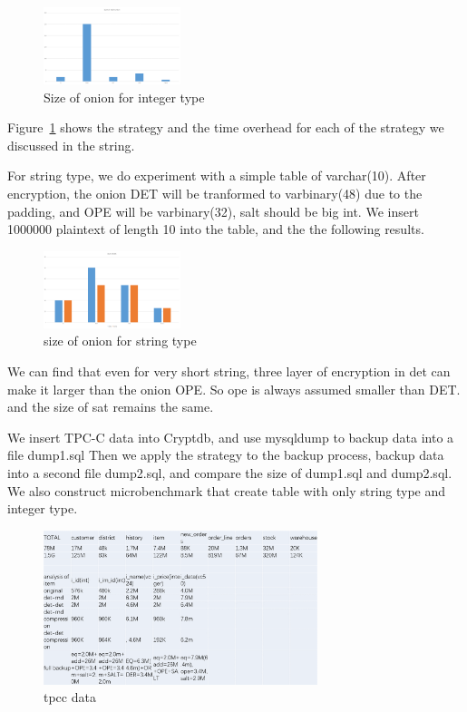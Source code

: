 \begin{figure}[tb]
\centering
\includegraphics[width=4cm]{images/sizeofeachonion.png}
\caption{Size of onion for integer type}
\label{fig:stack11}
\end{figure}

Figure~\ref{fig:stack11} shows the strategy and the time overhead for each of the strategy we discussed in the string.


For string type, we do experiment with a simple table of varchar(10). After encryption, the onion DET will be tranformed to varbinary(48) due to the padding, and OPE will be varbinary(32), salt should be big int. We insert 1000000 plaintext of length 10 into the table, and the the following results. 


\begin{figure}[tb]
\centering
\includegraphics[width=4cm]{images/sizeofstr.png}
\caption{size of onion for string type}
\label{fig:stack12}
\end{figure}


We can find that even for very short string, three layer of encryption in det can make it larger than the onion OPE. So ope is always assumed  smaller than DET. and the size of sat remains the same.


We insert TPC-C data into Cryptdb, and use mysqldump to backup data into a file dump1.sql Then we apply the strategy to the backup process, backup data into a second file dump2.sql, and compare the size of dump1.sql and dump2.sql. We also construct microbenchmark that create table with only string type and integer type.



\begin{figure}[tb]
\centering
\includegraphics[width=8cm]{images/tpcc.png}
\caption{tpcc data}
\label{fig:stack13}
\end{figure}


